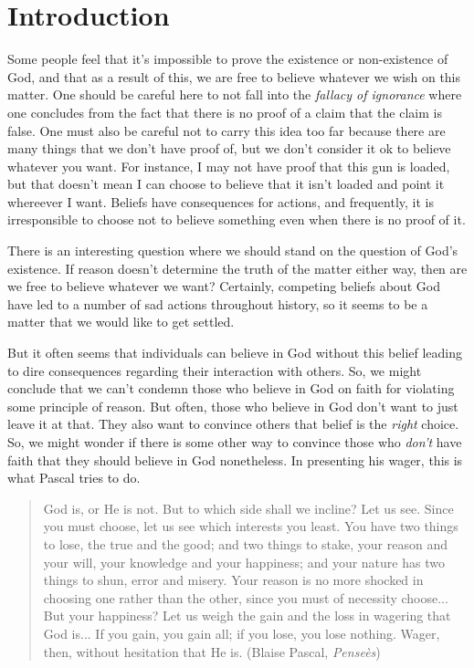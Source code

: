 \documentclass[letterpaper,10pt]{article}
\begin{document}
\section{Introduction}
Some people feel that it's impossible to prove the existence or non-existence of God, and that as a result of this, we are free to believe whatever we wish on this matter.  One should be careful here to not fall into the \textit{fallacy of ignorance} where one concludes from the fact that there is no proof of a claim that the claim is false. One must also be careful not to carry this idea too far because there are many things that we don't have proof of, but we don't consider it ok to believe whatever you want.  For instance, I may not have proof that this gun is loaded, but that doesn't mean I can choose to believe that it isn't loaded and point it whereever I want.  Beliefs have consequences for actions, and frequently, it is irresponsible to choose not to believe something even when there is no proof of it.

There is an interesting question where we should stand on the question of God's existence. If reason doesn't determine the truth of the matter either way, then are we free to believe whatever we want?  Certainly, competing beliefs about God have led to a number of sad actions throughout history, so it seems to be a matter that we would like to get settled.

But it often seems that individuals can believe in God without this belief leading to dire consequences regarding their interaction with others.  So, we might conclude that we can't condemn those who believe in God on faith for violating some principle of reason. But often, those who believe in God don't want to just leave it at that.  They also want to convince others that belief is the \textit{right} choice. So, we might wonder if there is some other way to convince those who \textit{don't} have faith that they should believe in God nonetheless.  In presenting his wager, this is what Pascal tries to do.

\begin{quotation}
    God is, or He is not. But to which side shall we incline? Let us see. Since you must choose, let us see which interests you least. You have two things to lose, the true and the good; and two things to stake, your reason and your will, your knowledge and your happiness; and your nature has two things to shun, error and misery. Your reason is no more shocked in choosing one rather than the other, since you must of necessity choose... But your happiness? Let us weigh the gain and the loss in wagering that God is... If you gain, you gain all; if you lose, you lose nothing. Wager, then, without hesitation that He is. (Blaise Pascal, \textit{Pense\`es})
  \end{quotation}
\end{document}
